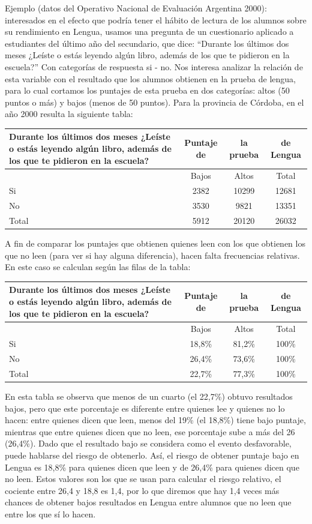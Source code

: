 \documentclass[]{book}
\begin{document}
Ejemplo (datos del Operativo Nacional de Evaluación Argentina 2000): interesados en el efecto que podría tener el hábito de lectura de los alumnos sobre su rendimiento en Lengua, usamos una pregunta de un cuestionario aplicado a estudiantes del último año del secundario, que dice: ``Durante los últimos dos meses ¿Leíste o estás leyendo algún libro, además de los que te pidieron en la escuela?'' Con categorías de respuesta si - no. Nos interesa analizar la relación de esta variable con el resultado que los alumnos obtienen en la prueba de lengua, para lo cual cortamos los puntajes de esta prueba en dos categorías: altos (50 puntos o más) y bajos (menos de 50 puntos). Para la provincia de Córdoba, en el año 2000 resulta la siguiente tabla:

\begin{longtable}[]{@{}lccc@{}}
\toprule
Durante los últimos dos meses ¿Leíste o estás leyendo algún libro, además de los que te pidieron en la escuela? & Puntaje de & la prueba & de Lengua\tabularnewline
\midrule
\endhead
& Bajos & Altos & Total\tabularnewline
Si & 2382 & 10299 & 12681\tabularnewline
No & 3530 & 9821 & 13351\tabularnewline
Total & 5912 & 20120 & 26032\tabularnewline
\bottomrule
\end{longtable}

A fin de comparar los puntajes que obtienen quienes leen con los que
obtienen los que no leen (para ver si hay alguna diferencia), hacen
falta frecuencias relativas. En este caso se calculan según las filas de la tabla:

\begin{longtable}[]{@{}lccc@{}}
\toprule
Durante los últimos dos meses ¿Leíste o estás leyendo algún libro, además de los que te pidieron en la escuela? & Puntaje de & la prueba & de Lengua\tabularnewline
\midrule
\endhead
& Bajos & Altos & Total\tabularnewline
Si & 18,8\% & 81,2\% & 100\%\tabularnewline
No & 26,4\% & 73,6\% & 100\%\tabularnewline
Total & 22,7\% & 77,3\% & 100\%\tabularnewline
\bottomrule
\end{longtable}

En esta tabla se observa que menos de un cuarto (el 22,7\%) obtuvo
resultados bajos, pero que este porcentaje es diferente entre quienes
lee y quienes no lo hacen: entre quienes dicen que leen, menos del 19\%
(el 18,8\%) tiene bajo puntaje, mientras que entre quienes dicen que no
leen, ese porcentaje sube a más del 26 (26,4\%). Dado que el resultado
bajo se considera como el evento desfavorable, puede hablarse del riesgo
de obtenerlo. Así, el riesgo de obtener puntaje bajo en Lengua es 18,8\%
para quienes dicen que leen y de 26,4\% para quienes dicen que no leen.
Estos valores son los que se usan para calcular el riesgo relativo, el
cociente entre 26,4 y 18,8 es 1,4, por lo que diremos que hay 1,4 veces
más chances de obtener bajos resultados en Lengua entre alumnos que no
leen que entre los que sí lo hacen.
\end{document}
